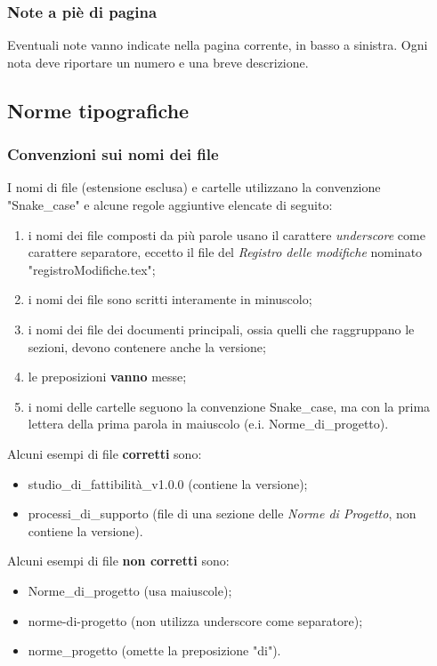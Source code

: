 \subsubsection{Note a piè di pagina}
Eventuali note vanno indicate nella pagina corrente, in basso a sinistra. Ogni nota deve riportare un numero e una breve descrizione.

\subsection{Norme tipografiche}
\subsubsection{Convenzioni sui nomi dei file}
I nomi di file (estensione esclusa) e cartelle utilizzano la convenzione "Snake\_case\glo" e alcune regole aggiuntive elencate di seguito: \begin{enumerate}
\item i nomi dei file composti da più parole usano il carattere \textit{underscore} come carattere separatore, eccetto il file del \textit{Registro delle modifiche} nominato "registroModifiche.tex";
\item i nomi dei file sono scritti interamente in minuscolo;
\item i nomi dei file dei documenti principali, ossia quelli che raggruppano le sezioni, devono contenere anche la versione;
\item le preposizioni \textbf{vanno} messe;
\item i nomi delle cartelle seguono la convenzione Snake\_case, ma con la prima lettera della prima parola in maiuscolo (e.i. Norme\_di\_progetto).
\end{enumerate}
Alcuni esempi di file \textbf{corretti} sono: \begin{itemize}
\item studio\_di\_fattibilità\_v1.0.0 (contiene la versione);
\item processi\_di\_supporto (file di una sezione delle \textit{Norme di Progetto}, non contiene la versione).
\end{itemize}
Alcuni esempi di file \textbf{non corretti} sono: \begin{itemize}
\item Norme\_di\_progetto (usa maiuscole);
\item norme-di-progetto (non utilizza underscore come separatore);
\item norme\_progetto (omette la preposizione "di").
\end{itemize}

